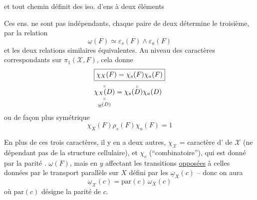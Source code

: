 et tout chemin  définit des iso. d'ens à deux éléments

Ces ens. ne sont pas indépendants, chaque paire de deux détermine le troisième, par la relation
\[
\underline{\omega}(F)\simeq\varepsilon_s(F)\wedge\varepsilon_a(F)
\]
et les deux relations similaires équivalentes. Au niveau des caractères correspondants sur $\pi_1(\mathscr{X},F)$, cela donne
\[
\begin{aligned}
&\boxed{\chi_X(F)=\chi_s(F)\chi_a(F)}\\
&\overset{\shortparallel}{\underset{\underline{\omega}(D)}{\underset{\shortparallel}{\chi_X(D)}}}=\chi_s(\overset{\shortparallel}{D})\chi_a(D)
\end{aligned}
\]
ou de façon plus symétrique
\[
\chi_X(F)\rho_s(F)\chi_a(F)=1
\]

En plus de ces trois caractères, il y en a deux autres, $\chi_{\mathscr X}$ = caractère d' de $\mathscr X$ (ne dépendant pas de la structure cellulaire), et $\chi_c$ (``combinatoire''), qui est donné par la parité .
  $\underline{\omega}(F)$, mais en $y$ affectant les transitions \uline{opposées} à celles données par  le transport parallèle sur $X$ défini par les $\underline{\omega}_X(c)$ -- donc on aura
\[
\underline{\omega}_{\mathscr X}(c)=\mathrm{par}(c)\,\omega_X(c)
\]
où $\mathrm{par}(c)$ désigne la parité de $c$.

